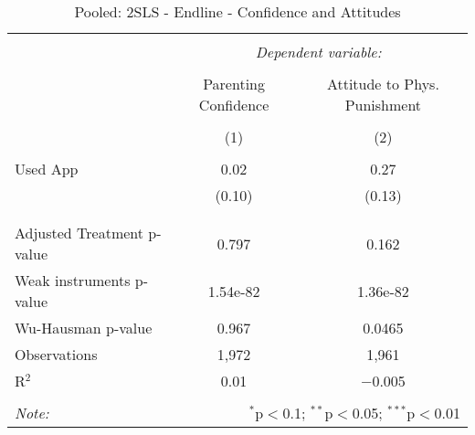 
\begin{table}[!htbp] \centering 
  \caption{Pooled: 2SLS - Endline - Confidence and Attitudes} 
  \label{tbl:Pooled: 2SLS - Endline - Confidence and Attitudes} 
\begin{tabular}{@{\extracolsep{5pt}}lcc} 
\\[-1.8ex]\hline 
\hline \\[-1.8ex] 
 & \multicolumn{2}{c}{\textit{Dependent variable:}} \\ 
\cline{2-3} 
\\[-1.8ex] & Parenting Confidence & Attitude to Phys. Punishment \\ 
\\[-1.8ex] & (1) & (2)\\ 
\hline \\[-1.8ex] 
 Used App & 0.02 & 0.27 \\ 
  & (0.10) & (0.13) \\ 
  & & \\ 
\hline \\[-1.8ex] 
Adjusted Treatment p-value & 0.797 & 0.162 \\ 
Weak instruments p-value & 1.54e-82 & 1.36e-82 \\ 
Wu-Hausman p-value & 0.967 & 0.0465 \\ 
Observations & 1,972 & 1,961 \\ 
R$^{2}$ & 0.01 & $-$0.005 \\ 
\hline 
\hline \\[-1.8ex] 
\textit{Note:}  & \multicolumn{2}{r}{$^{*}$p$<$0.1; $^{**}$p$<$0.05; $^{***}$p$<$0.01} \\ 
\end{tabular} 
\end{table} 
